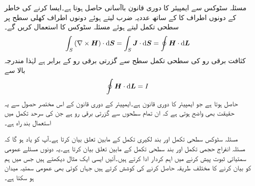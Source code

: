 مسئلہ سٹوکس سے ایمپیئر کا دوری قانون باآسانی حاصل ہوتا ہے۔ایسا کرنے کی خاطر   کے دونوں اطراف کا  کے ساتھ عددیہ ضرب لیتے ہوئے دونوں اطراف کھلی سطح  پر سطحی تکمل لیتے  ہوئے مسئلہ سٹوکس کا استعمال کریں گے۔ 
\begin{align*}
\int_S \left(\nabla \times \kvec{H} \right) \cdot \dif \kvec{S}=\int_S \kvec{J} \cdot \dif \kvec{S}=\oint \kvec{H} \cdot \dif \kvec{L}
\end{align*}
کثافت برقی رو کی سطحی تکمل سطح  سے گزرتی برقی رو کے برابر ہے لہٰذا مندرجہ بالا سے
\begin{align*}
\oint \kvec{H} \cdot \dif \kvec{L}=I
\end{align*}
حاصل ہوتا ہے جو ایمپیئر کا دوری قانون ہے۔ایمپیئر کے دوری قانون کے اس مختصر حصول سے یہ حقیقت بھی واضح ہوتی ہے کہ  ان تمام سطحوں سے گزرتی برقی رو ہے جن کی سرحد تکمل میں استعمال بند راہ ہے۔

مسئلہ سٹوکس  سطحی تکمل  اور بند لکیری تکمل کے مابین تعلق بیان کرتا ہے۔آپ کو یاد ہو گا کہ مسئلہ انفراج حجمی تکمل اور بند سطحی تکمل کے مابین تعلق بیان کرتا ہے۔یہ دونوں مسئلے عمومی سمتیاتی ثبوت پیش کرنے میں اہم کردار ادا کرتے ہیں۔آئیں ایسی ایک مثال دیکھتے ہیں جس میں ہم  کو بیان کرنے  کا مختلف طریقہ حاصل کرنے کی کوشش کرتے ہیں  جہاں  کوئی بھی عمومی سمتیہ میدان ہو سکتا ہے۔


